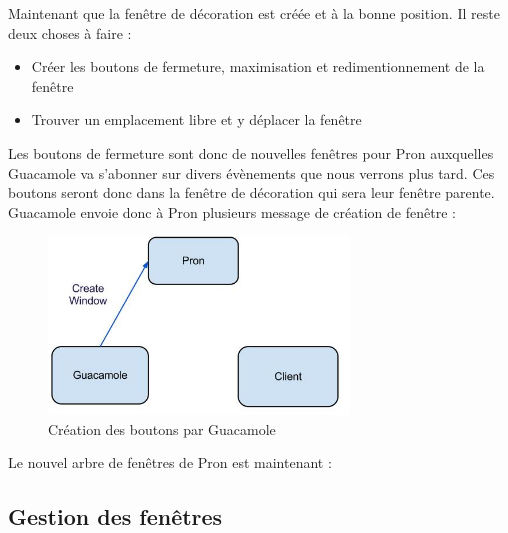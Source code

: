\begin{center}
\end{center}

Maintenant que la fenêtre de décoration est créée et à la bonne position.
Il reste deux choses à faire :

\begin{itemize}
  \item Créer les boutons de fermeture, maximisation et redimentionnement de la fenêtre
  \item Trouver un emplacement libre et y déplacer la fenêtre
\end{itemize}

Les boutons de fermeture sont donc de nouvelles fenêtres pour Pron auxquelles Guacamole va s'abonner sur divers évènements que nous verrons plus tard.
Ces boutons seront donc dans la fenêtre de décoration qui sera leur fenêtre parente.
Guacamole envoie donc à Pron plusieurs message de création de fenêtre :

\begin{figure}[H]
  \centering
  \includegraphics[width=8cm]{images/Guacamole_anim_6.jpg}
  \caption{Création des boutons par Guacamole}
  \label{fig:guacamole_anim_6}
\end{figure}

Le nouvel arbre de fenêtres de Pron est maintenant :

\begin{center}
\end{center}


\subsection{Gestion des fenêtres}